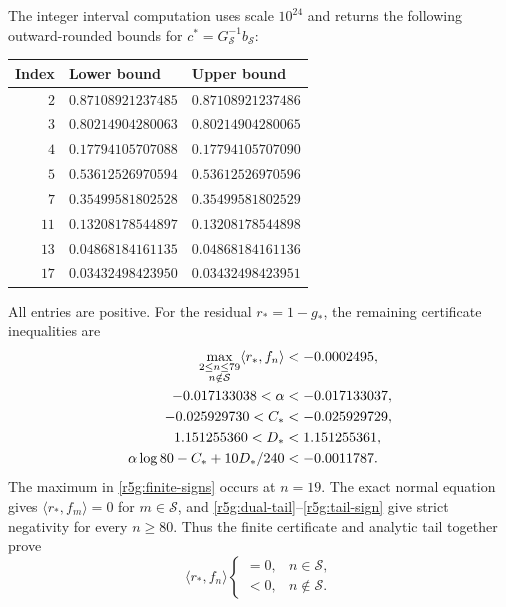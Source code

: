 \documentclass[11pt,a4paper]{article}
\theoremstyle{definition}\newtheorem{definition}[theorem]{Definition}
\theoremstyle{remark}\newtheorem{remark}[theorem]{Remark}
\numberwithin{equation}{section}
\begin{document}
The integer interval computation uses scale $10^{24}$ and returns
the following outward-rounded bounds for $c^*=G_{\mathcal S}^{-1}
b_{\mathcal S}$:
\begin{center}
\begin{tabular}{@{}rll@{}}
\toprule
Index & Lower bound & Upper bound\\
\midrule
$2$ & $0.87108921237485$ & $0.87108921237486$\\
$3$ & $0.80214904280063$ & $0.80214904280065$\\
$4$ & $0.17794105707088$ & $0.17794105707090$\\
$5$ & $0.53612526970594$ & $0.53612526970596$\\
$7$ & $0.35499581802528$ & $0.35499581802529$\\
$11$ & $0.13208178544897$ & $0.13208178544898$\\
$13$ & $0.04868184161135$ & $0.04868184161136$\\
$17$ & $0.03432498423950$ & $0.03432498423951$\\
\bottomrule
\end{tabular}
\end{center}
All entries are positive. For the residual $r_*=1-g_*$, the
remaining certificate inequalities are
\begin{align}
 \max_{\substack{2\le n\le79\\n\notin\mathcal S}}
           \langle r_*,f_n\rangle&<-0.0002495,
             \label{r5g:finite-signs}\\
 -0.017133038<\alpha&<-0.017133037,\notag\\
 -0.025929730<C_*&<-0.025929729,\notag\\
 1.151255360<D_*&<1.151255361,\notag\\
 \alpha\log80-C_*+10D_*/240&<-0.0011787.
             \label{r5g:tail-sign}
\end{align}
The maximum in \eqref{r5g:finite-signs} occurs at $n=19$.
The exact normal equation gives $\langle r_*,f_m\rangle=0$ for
$m\in\mathcal S$, and \eqref{r5g:dual-tail}--\eqref{r5g:tail-sign}
give strict negativity for every $n\ge80$.
Thus the finite certificate and analytic tail together prove
\begin{equation}\label{r5g:KKT}
 \langle r_*,f_n\rangle
 \begin{cases}=0,&n\in\mathcal S,\\<0,&n\notin\mathcal S.
 \end{cases}
\end{equation}
\end{document}
